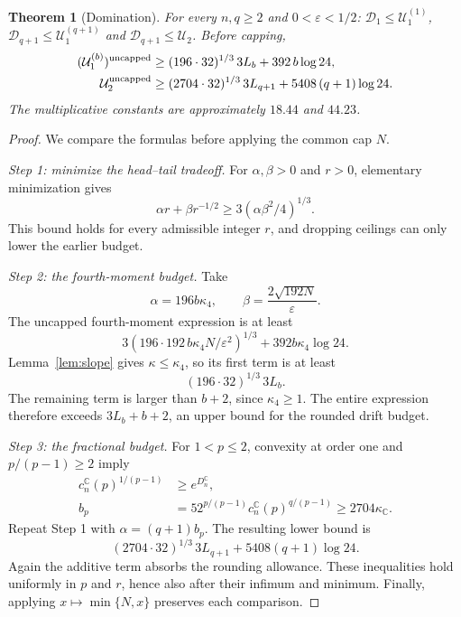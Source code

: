 \documentclass[11pt,a4paper]{article}
\newtheorem{theorem}{Theorem}[section]
\theoremstyle{definition}\newtheorem{definition}[theorem]{Definition}
\theoremstyle{remark}\newtheorem{remark}[theorem]{Remark}
\numberwithin{equation}{section}
\newcommand{\C}{\mathbb C}
\newcommand{\eps}{\varepsilon}
\begin{document}
\begin{theorem}[Domination]\label{thm:domination}
For every $n,q\ge2$ and $0<\eps<1/2$: $\mathcal D_1\le\mathcal U_1^{(1)}$,
$\mathcal D_{q+1}\le\mathcal U_1^{(q+1)}$ and $\mathcal D_{q+1}\le\mathcal U_2$. Before capping,
\begin{align*}
 (\mathcal U_1^{(b)})^{\rm uncapped}
 &\ge(196\cdot32)^{1/3}\,3L_b+392\,b\log24,\\
 \mathcal U_2^{\rm uncapped}
 &\ge(2704\cdot32)^{1/3}\,3L_{q+1}+5408\,(q+1)\log24.
\end{align*}
The multiplicative constants are approximately \(18.44\) and \(44.23\).
\end{theorem}
\begin{proof}
We compare the formulas before applying the common cap \(N\).

\emph{Step 1: minimize the head--tail tradeoff.}
For \(\alpha,\beta>0\) and \(r>0\), elementary minimization gives
\[
 \alpha r+\beta r^{-1/2}
 \ge3(\alpha\beta^2/4)^{1/3}.
\]
This bound holds for every admissible integer \(r\), and dropping ceilings
can only lower the earlier budget.

\emph{Step 2: the fourth-moment budget.}
Take
\[
 \alpha=196b\kappa_4,
 \qquad \beta=\frac{2\sqrt{192N}}{\eps}.
\]
The uncapped fourth-moment expression is at least
\[
 3(196\cdot192\,b\kappa_4N/\eps^2)^{1/3}
 +392b\kappa_4\log24.
\]
Lemma~\ref{lem:slope} gives \(\kappa\le\kappa_4\), so its first term is at least
\[
 (196\cdot32)^{1/3}\,3L_b.
\]
The remaining term is larger than \(b+2\), since \(\kappa_4\ge1\).
The entire expression therefore exceeds
\(3L_b+b+2\), an upper bound for the rounded drift budget.

\emph{Step 3: the fractional budget.}
For \(1<p\le2\), convexity at order one and \(p/(p-1)\ge2\) imply
\begin{align*}
 c_n^{\C}(p)^{1/(p-1)}&\ge e^{D_n^{\C}},\\
 b_p&=52^{p/(p-1)}c_n^{\C}(p)^{q/(p-1)}
       \ge2704\kappa_{\C}.
\end{align*}
Repeat Step 1 with \(\alpha=(q+1)b_p\).
The resulting lower bound is
\[
 (2704\cdot32)^{1/3}\,3L_{q+1}
 +5408(q+1)\log24.
\]
Again the additive term absorbs the rounding allowance.
These inequalities hold uniformly in \(p\) and \(r\), hence also after their
infimum and minimum. Finally, applying \(x\mapsto\min\{N,x\}\) preserves
each comparison.
\end{proof}
\end{document}

